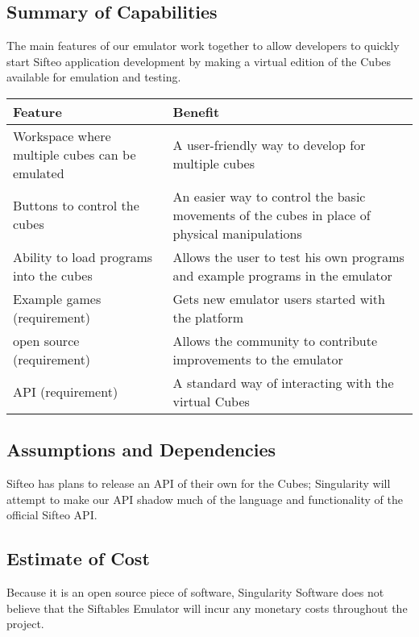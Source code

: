 \documentclass[12pt]{article}
\begin{document}
              \subsection{Summary of Capabilities}
              The main features of our emulator work together to allow developers to quickly start Sifteo application development by making a virtual edition of the Cubes available for emulation and testing.
              \begin{table}[h]
                \begin{tabular}{p{3in} | p{3in}}
                  \textbf{Feature} & \textbf{Benefit} \\ \hline
                  Workspace where multiple cubes can be emulated
                            & A user-friendly way to develop for multiple cubes \\ \hline
                  Buttons to control the cubes
                            & An easier way to control the basic movements of the cubes in place of physical manipulations \\ \hline
                  Ability to load programs into the cubes
                            & Allows the user to test his own programs and example programs in the emulator \\ \hline
                  Example games (requirement)
                            & Gets new emulator users started with the platform \\ \hline
                  \gls{open source}\index{Open source}  (requirement)
                            & Allows the community to contribute improvements to the emulator \\ \hline
                  \gls{API}\index{API} (requirement)
                            & A standard way of interacting with the virtual Cubes
                \end{tabular}
              \end{table}

              \subsection{Assumptions and Dependencies}
              Sifteo has plans to release an \gls{API} of their own for the Cubes; Singularity will attempt to make our \gls{API} shadow much of the language and functionality of the official Sifteo \gls{API}. 

              \subsection{Estimate of Cost}
			  Because it is an \gls{open source} piece of software, Singularity Software does not believe that the Siftables Emulator will incur any monetary costs throughout the project.
\clearpage
\end{document}

